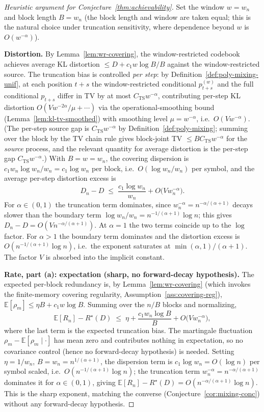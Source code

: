 \documentclass[11pt]{article}
\newcommand{\E}{\mathbb{E}}
\theoremstyle{plain}
\theoremstyle{definition}
\theoremstyle{remark}
\begin{document}
\begin{proof}[Heuristic argument for Conjecture~\ref{thm:achievability}]
Set the window $w = w_n$ and block length $B = w_n$ (the block
length and window are taken equal; this is the natural choice
under truncation sensitivity, where dependence beyond $w$ is
$O(w^{-\alpha})$).

\textbf{Distortion.}
By Lemma~\ref{lem:wr-covering}, the window-restricted codebook
achieves average KL distortion $\leq D + c_1 w \log B / B$ against
the window-restricted source. The truncation bias is controlled
\emph{per step}: by Definition~\ref{def:poly-mixing-unif}, at each
position $t+s$ the window-restricted conditional
$p_{t+s}^{(w)}$ and the full conditional $p_{t+s}$ differ in TV by
at most $C_{\mathrm{TS}} w^{-\alpha}$, contributing per-step KL
distortion $O(V w^{-2\alpha} / \mu + \cdots)$ via the
operational-smoothing bound (Lemma~\ref{lem:kl-tv-smoothed}) with
smoothing level $\mu = w^{-\alpha}$, i.e.\ $O(V w^{-\alpha})$.
(The per-step source gap is $C_{\mathrm{TS}} w^{-\alpha}$ by
Definition~\ref{def:poly-mixing}; summing over the block by the TV
chain rule gives block-joint TV $\leq B C_{\mathrm{TS}} w^{-\alpha}$
for the \emph{source} process, and the relevant quantity for
average distortion is the per-step gap $C_{\mathrm{TS}} w^{-\alpha}$.)
With $B = w = w_n$, the covering dispersion is
$c_1 w_n \log w_n / w_n = c_1 \log w_n$ per block, i.e.\
$O(\log w_n / w_n)$ per symbol, and the average per-step distortion
excess is
\[
D_n - D \;\leq\; \frac{c_1 \log w_n}{w_n}
   + O\!\bigl(V w_n^{-\alpha}\bigr).
\]
For $\alpha \in (0,1)$ the truncation term dominates, since
$w_n^{-\alpha} = n^{-\alpha/(\alpha+1)}$ decays slower than the
boundary term $\log w_n / w_n = n^{-1/(\alpha+1)}\log n$; this gives
$D_n - D = O(V n^{-\alpha/(\alpha+1)})$. At $\alpha = 1$ the two
terms coincide up to the $\log$ factor. For $\alpha > 1$ the
boundary term dominates and the distortion excess is
$O(n^{-1/(\alpha+1)}\log n)$, i.e.\ the exponent saturates at
$\min(\alpha,1)/(\alpha+1)$. The factor $V$ is absorbed into the
implicit constant.

\textbf{Rate, part (a): expectation (sharp, no forward-decay hypothesis).}
The expected per-block redundancy is, by
Lemma~\ref{lem:wr-covering} (which invokes the finite-memory
covering regularity, Assumption~\ref{ass:covering-reg}),
$\E[\rho_m] \leq \eta B + c_1 w \log B$. Summing over the $n/B$
blocks and normalizing,
\[
\E[R_n] - R^\star(D)
\;\leq\;
\eta + \frac{c_1 w_n \log B}{B} + O\!\bigl(V w_n^{-\alpha}\bigr),
\]
where the last term is the expected truncation bias. The martingale
fluctuation $\rho_m - \E[\rho_m \mid \cdot]$ has mean zero and
contributes nothing in expectation, so no covariance control (hence
no forward-decay hypothesis) is needed. Setting $\eta = 1/w_n$,
$B = w_n = n^{1/(\alpha+1)}$, the dispersion term is
$c_1 \log w_n = O(\log n)$ per symbol scaled, i.e.\
$O(n^{-1/(\alpha+1)}\log n)$; the truncation term
$w_n^{-\alpha} = n^{-\alpha/(\alpha+1)}$ dominates it for
$\alpha \in (0,1)$, giving
$\E[R_n] - R^\star(D) = O(n^{-\alpha/(\alpha+1)}\log n)$. This is
the sharp exponent, matching the converse
(Conjecture~\ref{cor:mixing-conc}) without any forward-decay
hypothesis.


\end{proof}
\end{document}

